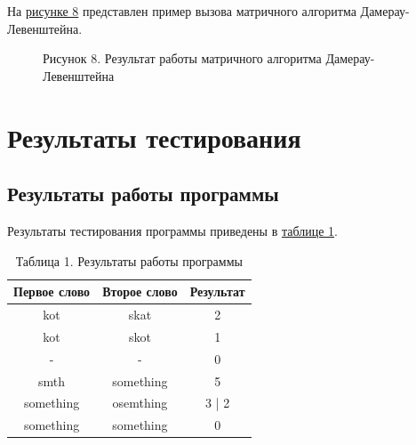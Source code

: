 \documentclass[12pt]{report}
\begin{document}
	\newpage
	На \hyperref[picture_8]{рисунке 8} представлен пример вызова матричного алгоритма Дамерау-Левенштейна.
	\begin{figure}[h!]\label{picture_8}
		\caption*{Рисунок 8. Результат работы матричного алгоритма Дамерау-Левенштейна}
	\end{figure}

	\section{Результаты тестирования}
	\subsection{Результаты работы программы}
	Результаты тестирования программы приведены в \hyperref[table]{таблице 1}.
	
	\begin{table}[h]\label{table}
		\caption*{Таблица 1. Результаты работы программы}
		\begin{center}
			\begin{tabular}{|c c c|} 
				\hline
				Первое слово & Второе слово & Результат \\ [0.5ex] 
				\hline
				kot & skat & 2\\
				kot & skot & 1\\
				- & - & 0\\
				smth & something & 5\\
				something & osemthing & 3 | 2\\
				something & something & 0\\
				\hline
			\end{tabular}
		\end{center}
	\end{table}
	\onehalfspacing
\end{document}
